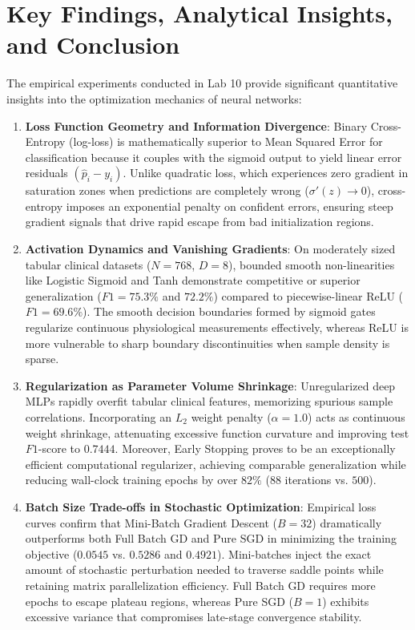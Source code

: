 \documentclass[12pt]{article}
\begin{document}
\section{Key Findings, Analytical Insights, and Conclusion}

The empirical experiments conducted in Lab 10 provide significant quantitative insights into the optimization mechanics of neural networks:

\begin{enumerate}
    \item \textbf{Loss Function Geometry and Information Divergence}:
    Binary Cross-Entropy (log-loss) is mathematically superior to Mean Squared Error for classification because it couples with the sigmoid output to yield linear error residuals $(\hat{p}_i - y_i)$. Unlike quadratic loss, which experiences zero gradient in saturation zones when predictions are completely wrong ($\sigma'(z) \to 0$), cross-entropy imposes an exponential penalty on confident errors, ensuring steep gradient signals that drive rapid escape from bad initialization regions.

    \item \textbf{Activation Dynamics and Vanishing Gradients}:
    On moderately sized tabular clinical datasets ($N=768$, $D=8$), bounded smooth non-linearities like Logistic Sigmoid and Tanh demonstrate competitive or superior generalization ($F1 = 75.3\%$ and $72.2\%$) compared to piecewise-linear ReLU ($F1 = 69.6\%$). The smooth decision boundaries formed by sigmoid gates regularize continuous physiological measurements effectively, whereas ReLU is more vulnerable to sharp boundary discontinuities when sample density is sparse.

    \item \textbf{Regularization as Parameter Volume Shrinkage}:
    Unregularized deep MLPs rapidly overfit tabular clinical features, memorizing spurious sample correlations. Incorporating an $L_2$ weight penalty ($\alpha = 1.0$) acts as continuous weight shrinkage, attenuating excessive function curvature and improving test $F1$-score to $0.7444$. Moreover, Early Stopping proves to be an exceptionally efficient computational regularizer, achieving comparable generalization while reducing wall-clock training epochs by over $82\%$ ($88$ iterations vs. $500$).

    \item \textbf{Batch Size Trade-offs in Stochastic Optimization}:
    Empirical loss curves confirm that Mini-Batch Gradient Descent ($B=32$) dramatically outperforms both Full Batch GD and Pure SGD in minimizing the training objective ($0.0545$ vs. $0.5286$ and $0.4921$). Mini-batches inject the exact amount of stochastic perturbation needed to traverse saddle points while retaining matrix parallelization efficiency. Full Batch GD requires more epochs to escape plateau regions, whereas Pure SGD ($B=1$) exhibits excessive variance that compromises late-stage convergence stability.
\end{enumerate}
\end{document}
